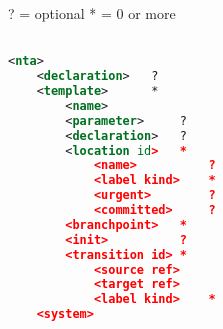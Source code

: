 ? = optional
* = 0 or more

\begin{lstlisting}[language=XML]

<nta>
	<declaration>	?
	<template> 	    *
		<name>
		<parameter>	    ?
		<declaration> 	?
		<location id> 	*
			<name>	        ?
			<label kind>	*
			<urgent>	    ?
			<committed>	    ?
		<branchpoint>   *
		<init>		    ?
		<transition id>	*
			<source ref>
			<target ref>
			<label kind> 	*
	<system>

\end{lstlisting}